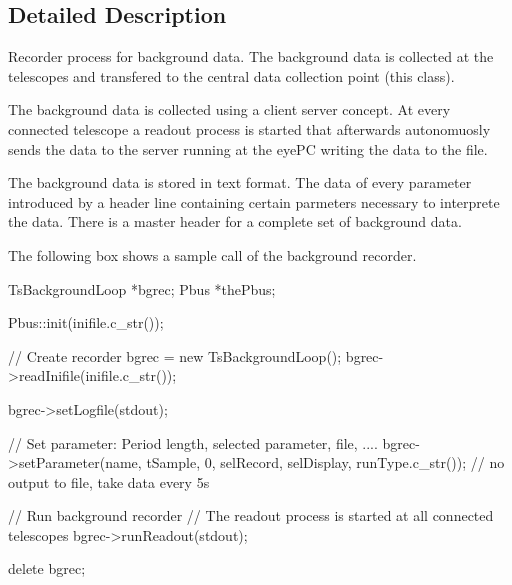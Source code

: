 \subsection{Detailed Description}
\begin{DoxyVerb}Recorder process for background data.
The background data is collected at the
telescopes and transfered to the central
data collection point (this class).

The background data is collected using a client server concept. At every
connected telescope a readout process is started that afterwards autonomuosly
sends the data to the server running at the eyePC writing the data to the file.

The background data is stored in text format. The data of every parameter
introduced by a header line containing certain parmeters necessary to
interprete the data. There is a master header for a complete set of background
data.

The following box shows a sample call of the background recorder.
\end{DoxyVerb}
 \begin{DoxyVerb}  TsBackgroundLoop *bgrec;
  Pbus *thePbus;

  Pbus::init(inifile.c_str());


  // Create recorder
  bgrec = new TsBackgroundLoop();
  bgrec->readInifile(inifile.c_str());

  bgrec->setLogfile(stdout);

  // Set parameter: Period length, selected parameter, file, ....
  bgrec->setParameter(name, tSample, 0, selRecord, selDisplay, runType.c_str());  // no output to file, take data every 5s

  // Run background recorder
  // The readout process is started at all connected telescopes
  bgrec->runReadout(stdout);

  delete bgrec;
\end{DoxyVerb}


